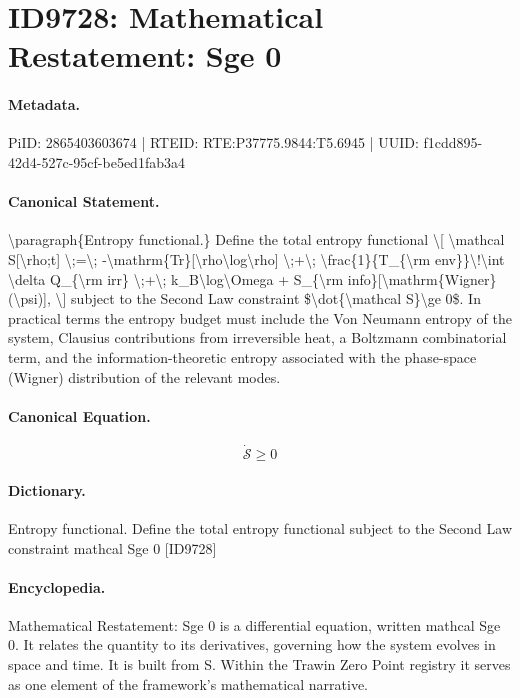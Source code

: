 \section*{ID9728: Mathematical Restatement: Sge 0}
\paragraph{Metadata.}
PiID: 2865403603674 | RTEID: RTE:P37775.9844:T5.6945 | UUID: f1cdd895-42d4-527c-95cf-be5ed1fab3a4

\paragraph{Canonical Statement.}
\textbackslash{}paragraph\{Entropy functional.\} Define the total entropy functional \textbackslash{}[ \textbackslash{}mathcal S[\textbackslash{}rho;t] \textbackslash{};=\textbackslash{}; -\textbackslash{}mathrm\{Tr\}[\textbackslash{}rho\textbackslash{}log\textbackslash{}rho] \textbackslash{};+\textbackslash{}; \textbackslash{}frac\{1\}\{T\_\{\textbackslash{}rm env\}\}\textbackslash{}!\textbackslash{}int \textbackslash{}delta Q\_\{\textbackslash{}rm irr\} \textbackslash{};+\textbackslash{}; k\_B\textbackslash{}log\textbackslash{}Omega + S\_\{\textbackslash{}rm info\}[\textbackslash{}mathrm\{Wigner\}(\textbackslash{}psi)], \textbackslash{}] subject to the Second Law constraint \$\textbackslash{}dot\{\textbackslash{}mathcal S\}\textbackslash{}ge 0\$. In practical terms the entropy budget must include the Von Neumann entropy of the system, Clausius contributions from irreversible heat, a Boltzmann combinatorial term, and the information-theoretic entropy associated with the phase-space (Wigner) distribution of the relevant modes.

\paragraph{Canonical Equation.}
\[
\dot{\mathcal S}\ge 0
\]

\paragraph{Dictionary.}
Entropy functional. Define the total entropy functional subject to the Second Law constraint mathcal Sge 0 [ID9728]

\paragraph{Encyclopedia.}
Mathematical Restatement: Sge 0 is a differential equation, written mathcal Sge 0. It relates the quantity to its derivatives, governing how the system evolves in space and time. It is built from S. Within the Trawin Zero Point registry it serves as one element of the framework's mathematical narrative.
